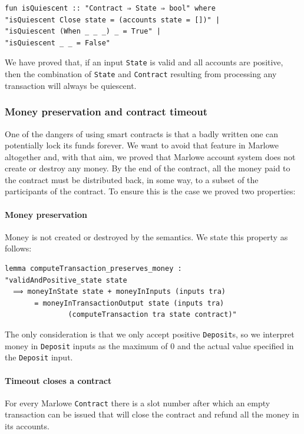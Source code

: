 \documentclass[runningheads]{llncs}
\begin{document}
\begin{verbatim}
fun isQuiescent :: "Contract ⇒ State ⇒ bool" where
"isQuiescent Close state = (accounts state = [])" |
"isQuiescent (When _ _ _) _ = True" |
"isQuiescent _ _ = False"
\end{verbatim}
\noindent
We have proved that, if an input \texttt{State} is valid and all accounts are positive, then the combination of \texttt{State} and \texttt{Contract} resulting from processing any transaction will always be quiescent.

\subsubsection{Money preservation and contract timeout}

One of the dangers of using smart contracts is that a badly written one can potentially lock its funds forever. We want to avoid that feature in Marlowe altogether and, with that aim, we proved that Marlowe account system does not create or destroy any money. By the end of the contract, all the money paid to the contract must be distributed back, in some way, to a subset of the participants of the contract.
To ensure this is the case we proved two properties:

\paragraph{Money preservation}
Money is not created or destroyed by the semantics. We state this property as follows:

\begin{verbatim}
lemma computeTransaction_preserves_money :
"validAndPositive_state state
  ⟹ moneyInState state + moneyInInputs (inputs tra)
       = moneyInTransactionOutput state (inputs tra)
               (computeTransaction tra state contract)"
\end{verbatim}
\noindent
The only consideration is that we only accept positive \texttt{Deposit}s, so we interpret money in \texttt{Deposit} inputs as the maximum of $0$ and the actual value specified in the \texttt{Deposit} input.

\paragraph{Timeout closes a contract}

For every Marlowe \texttt{Contract} there is a slot number after which an empty transaction can be issued that will close the contract and refund all the money in its accounts.
\end{document}
